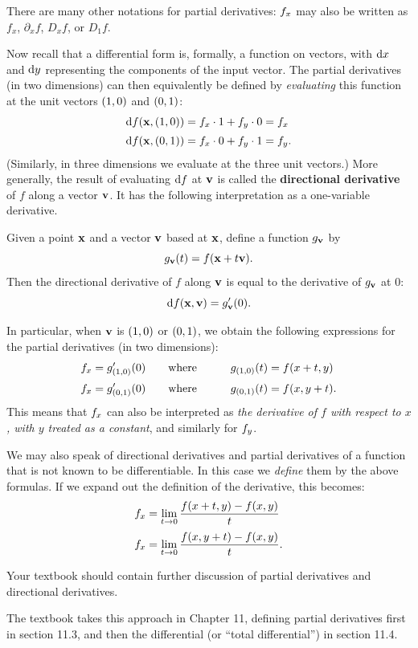 \documentclass[12pt]{amsart}
\begin{document}
There are many other notations for partial derivatives: ${f}_{x}$ may also be written as $f_x$, $\partial_x f$, $D_x f$, or $D_1 f$.

Now recall that a differential form is, formally, a function on vectors, with ${\mathrm{d} x}$ and ${\mathrm{d} y}$ representing the components of the input vector.
The partial derivatives (in two dimensions) can then equivalently be defined by \emph{evaluating} this function at the unit vectors $(1,0)$ and $(0,1)$:
\begin{align*}
  {\ensuremath{\mathrm{d} f}}(\mathbf{x},(1,0)) &= {f}_{x}\cdot 1 + {f}_{y}\cdot 0 = {f}_{x}\\[2pt]
  {\ensuremath{\mathrm{d} f}}(\mathbf{x},(0,1)) &= {f}_{x}\cdot 0 + {f}_{y}\cdot 1 = {f}_{y}.
\end{align*}
(Similarly, in three dimensions we evaluate at the three unit vectors.)
More generally, the result of evaluating ${\mathrm{d} f}$ at $\mathbf{v}$ is called the \textbf{directional derivative} of $f$ along a vector $\mathbf{v}$.
It has the following interpretation as a one-variable derivative.

\begin{thm}
  Given a point $\mathbf{x}$ and a vector $\mathbf{v}$ based at $\mathbf{x}$, define a function $g_{\mathbf{v}}$ by
  \[ g_{\mathbf{v}}(t) = f(\mathbf{x} + t \mathbf{v}). \]
  Then the directional derivative of $f$ along $\mathbf{v}$ is equal to the derivative of $g_{\mathbf{v}}$ at $0$:
  \[ {\mathrm{d} f}(\mathbf{x},\mathbf{v}) = g_{\mathbf{v}}'(0). \]
\end{thm}

In particular, when $\mathbf{v}$ is $(1,0)$ or $(0,1)$, we obtain the following expressions for the partial derivatives (in two dimensions):
\begin{alignat*}{2}
  {f}_{x} &= g_{(1,0)}'(0) \qquad\text{where}\qquad & g_{(1,0)}(t) &= f(x+t,y)\\[2pt]
  {f}_{x} &= g_{(0,1)}'(0) \qquad\text{where}\qquad & g_{(0,1)}(t) &= f(x,y+t).
\end{alignat*}
This means that ${f}_{x}$ can also be interpreted as \emph{the derivative of $f$ with respect to $x$, with $y$ treated as a constant}, and similarly for ${f}_{y}$.

We may also speak of directional derivatives and partial derivatives of a function that is not known to be differentiable.
In this case we \emph{define} them by the above formulas.
If we expand out the definition of the derivative, this becomes:
\begin{align}
  {f}_{x} &= \lim_{t\to 0} \frac{f(x+t,y) - f(x,y)}{t}\\[2pt]
  {f}_{x} &= \lim_{t\to 0} \frac{f(x,y+t) - f(x,y)}{t}.
\end{align}
\begin{notextbook}Your textbook should contain further discussion of partial derivatives and directional derivatives.\end{notextbook}%
\begin{stewart}The textbook takes this approach in Chapter 11, defining partial derivatives first in section 11.3, and then the differential (or ``total differential'') in section 11.4.\end{stewart}
\end{document}
